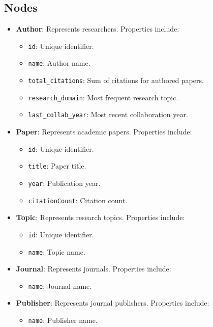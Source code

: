 \documentclass[conference, 12pt]{IEEEtran}
\begin{document}
\subsection{Nodes}
\begin{itemize}
    \item \textbf{Author}: Represents researchers. Properties include:
    \begin{itemize}
        \item \texttt{id}: Unique identifier.
        \item \texttt{name}: Author name.
        \item \texttt{total\_citations}: Sum of citations for authored papers.
        \item \texttt{research\_domain}: Most frequent research topic.
        \item \texttt{last\_collab\_year}: Most recent collaboration year.
    \end{itemize}
    \item \textbf{Paper}: Represents academic papers. Properties include:
    \begin{itemize}
        \item \texttt{id}: Unique identifier.
        \item \texttt{title}: Paper title.
        \item \texttt{year}: Publication year.
        \item \texttt{citationCount}: Citation count.
    \end{itemize}
    \item \textbf{Topic}: Represents research topics. Properties include:
    \begin{itemize}
        \item \texttt{id}: Unique identifier.
        \item \texttt{name}: Topic name.
    \end{itemize}
    \item \textbf{Journal}: Represents journals. Properties include:
    \begin{itemize}
        \item \texttt{name}: Journal name.
    \end{itemize}
    \item \textbf{Publisher}: Represents journal publishers. Properties include:
    \begin{itemize}
        \item \texttt{name}: Publisher name.
    \end{itemize}
\end{itemize}
\end{document}
